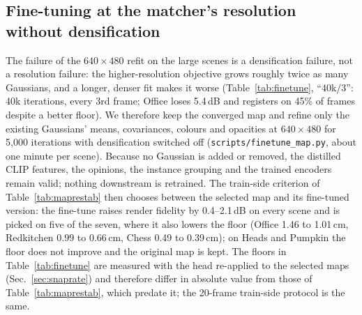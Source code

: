 \documentclass[journal]{IEEEtran}
\begin{document}
\subsection{Fine-tuning at the matcher's resolution without densification}
\label{sec:finetune}
The failure of the $640{\times}480$ refit on the large scenes is a
densification failure, not a resolution failure: the higher-resolution
objective grows roughly twice as many Gaussians, and a longer, denser fit
makes it worse (Table~\ref{tab:finetune}, ``40k/3'': 40k iterations, every
3rd frame; Office loses 5.4\,dB and registers on 45\% of frames despite a
better floor). We therefore keep the converged map and refine only the
existing Gaussians' means, covariances, colours and opacities at
$640{\times}480$ for 5,000 iterations with densification switched off
(\texttt{scripts/finetune\_map.py}, about one minute per scene). Because no
Gaussian is added or removed, the distilled CLIP features, the opinions, the
instance grouping and the trained encoders remain valid; nothing downstream
is retrained. The train-side criterion of Table~\ref{tab:maprestab} then
chooses between the selected map and its fine-tuned version: the fine-tune
raises render fidelity by 0.4--2.1\,dB on every scene and is picked on five
of the seven, where it also lowers the floor (Office 1.46 to 1.01\,cm,
Redkitchen 0.99 to 0.66\,cm, Chess 0.49 to 0.39\,cm); on Heads and Pumpkin
the floor does not improve and the original map is kept. The floors in
Table~\ref{tab:finetune} are measured with the head re-applied to the
selected maps (Sec.~\ref{sec:snaprate}) and therefore differ in absolute
value from those of Table~\ref{tab:maprestab}, which predate it; the
20-frame train-side protocol is the same.
\end{document}
